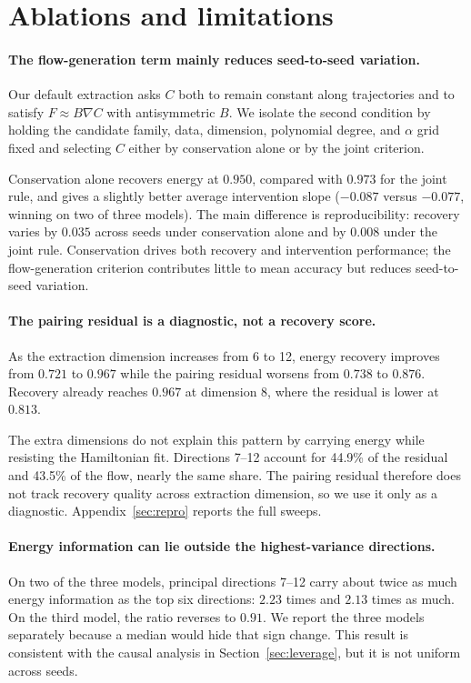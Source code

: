 \section{Ablations and limitations}
\label{sec:ablations}

\paragraph{The flow-generation term mainly reduces seed-to-seed variation.} Our default extraction
asks $C$ both to remain constant along trajectories and to satisfy $F \approx B\nabla C$ with
antisymmetric $B$. We isolate the second condition by holding the candidate family, data, dimension,
polynomial degree, and $\alpha$ grid fixed and selecting $C$ either by conservation alone or by the
joint criterion.

Conservation alone recovers energy at $0.950$, compared with $0.973$ for the joint rule, and gives a
slightly better average intervention slope ($-0.087$ versus $-0.077$, winning on two of three
models). The main difference is reproducibility: recovery varies by $0.035$ across seeds under
conservation alone and by $0.008$ under the joint rule. Conservation drives both recovery and
intervention performance; the flow-generation criterion contributes little to mean accuracy but
reduces seed-to-seed variation.

\paragraph{The pairing residual is a diagnostic, not a recovery score.} As the extraction dimension
increases from 6 to 12, energy recovery improves from $0.721$ to $0.967$ while the pairing residual
worsens from $0.738$ to $0.876$. Recovery already reaches $0.967$ at dimension 8, where the residual
is lower at $0.813$.

The extra dimensions do not explain this pattern by carrying energy while resisting the Hamiltonian
fit. Directions 7--12 account for 44.9\% of the residual and 43.5\% of the flow, nearly the same
share. The pairing residual therefore does not track recovery quality across extraction dimension, so
we use it only as a diagnostic. Appendix~\ref{sec:repro} reports the full sweeps.

\paragraph{Energy information can lie outside the highest-variance directions.} On two of the three
models, principal directions 7--12 carry about twice as much energy information as the top six
directions: $2.23$ times and $2.13$ times as much. On the third model, the ratio reverses to $0.91$.
We report the three models separately because a median would hide that sign change. This result is
consistent with the causal analysis in Section~\ref{sec:leverage}, but it is not uniform across
seeds.

